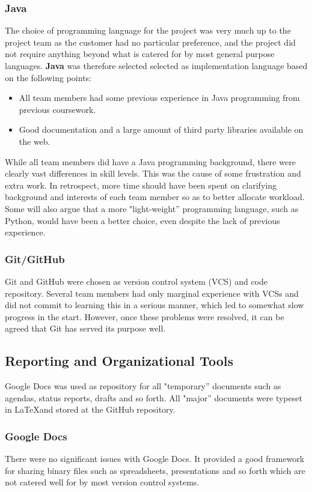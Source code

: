 \subsubsection{Java}
The choice of programming language for the project was very much up to the
project team as the customer had no particular preference, and the
project did not require anything beyond what is catered for by most
general purpose languages. \textbf{Java} was therefore selected 
selected as implementation language based on the following points:

\begin{itemize}
\item All team members had some previous experience in Java
  programming from previous coursework.
\item Good documentation and a large amount of third party libraries
  available on the web.
\end{itemize}

While all team members did have a Java programming background, there
were clearly vast differences in skill levels. This was the cause of
some frustration and extra work. In retrospect, more time should have been spent
on clarifying background and interests of each team member so as to
better allocate workload. Some will also argue that a more
"light-weight'' programming language, such as Python, would have been a
better choice, even despite the lack of previous experience.

\subsubsection{Git/GitHub}
Git and GitHub were chosen as version control system (VCS) and code
repository. Several team members had only marginal experience with
VCSs and did not commit to learning this in a serious manner, which
led to somewhat slow progress in the start. However, once these problems
were resolved, it can be agreed that Git has served its purpose well.


\subsection{Reporting and Organizational Tools}
Google Docs was used as repository for all "temporary'' documents such
as agendas, status reports, drafts and so forth. All "major''
documents were typeset in \LaTeX and stored at the GitHub repository.

\subsubsection{Google Docs}
There were no significant issues with Google Docs. It provided a good
framework for sharing binary files such as spreadsheets, presentations and so forth which
are not catered well for by most version control systems.


